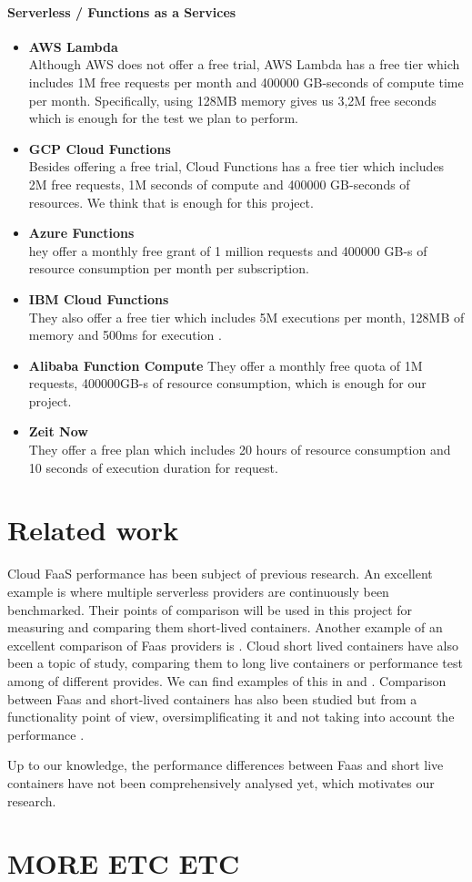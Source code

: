 \documentclass[11pt]{article}
\begin{document}
\paragraph{Serverless / Functions as a Services}
\begin{itemize}
\item \textbf{AWS Lambda} \\
Although AWS does not offer a free trial, AWS Lambda has a free tier which includes 1M free requests per month and 400000 GB-seconds of compute time per month. Specifically, using 128MB memory gives us  3,2M free seconds which is enough for the test we plan to perform.

\item \textbf{GCP Cloud Functions} \\
Besides offering a free trial, Cloud Functions has a free tier which includes 2M free requests, 1M seconds of compute and 400000 GB-seconds of resources. We think that is enough for this project.

\item \textbf{Azure Functions}\\
hey offer a monthly free grant of 1 million requests and 400000 GB-s of resource consumption per month per subscription.

\item \textbf{IBM Cloud Functions} \\
They also offer a free tier which includes 5M executions per month, 128MB of memory and 500ms for execution .

\item \textbf{Alibaba Function Compute}
They offer a monthly free quota of 1M requests, 400000GB-s of resource consumption, which is enough for our project.

\item \textbf{Zeit Now} \\
They offer a free plan which includes 20 hours of resource consumption and 10 seconds of execution duration for request.

\end{itemize}

\section{Related work}
Cloud FaaS performance has been subject of previous research. An excellent example is \cite{aa} where multiple serverless providers are continuously been benchmarked. Their points of comparison will be used in this project for measuring and comparing them short-lived containers. Another example of an excellent comparison of Faas providers is \cite{bb}. Cloud short lived containers have also been a topic of study, comparing them to long live containers or performance test among of different provides. We can find examples of this in \cite{cc} and \cite{dd}. Comparison between Faas and short-lived containers has also been studied but from a functionality point of view, oversimplificating it and not taking into account the performance \cite{ee}\cite{ff}\cite{gg}.

Up to our knowledge, the performance differences between Faas and short live containers have not been comprehensively analysed yet, which motivates our research.

\section{MORE ETC ETC}
\end{document}
